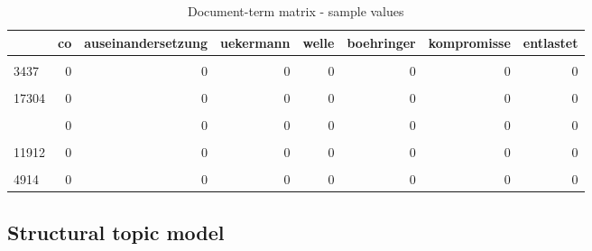 \documentclass[
  12pt,
]{article}
\begin{document}
\begin{table}[H]

\caption{\label{tab:Document term matrix}Document-term matrix - sample values \label{table:dtm}}
\centering
\fontsize{7}{9}\selectfont
\begin{tabular}[t]{lrrrrrrr}
\toprule
  & co & auseinandersetzung & uekermann & welle & boehringer & kompromisse & entlastet\\
\midrule
\cellcolor{gray!6}{16805} & \cellcolor{gray!6}{0} & \cellcolor{gray!6}{0} & \cellcolor{gray!6}{0} & \cellcolor{gray!6}{0} & \cellcolor{gray!6}{0} & \cellcolor{gray!6}{0} & \cellcolor{gray!6}{0}\\
3437 & 0 & 0 & 0 & 0 & 0 & 0 & 0\\
\cellcolor{gray!6}{10876} & \cellcolor{gray!6}{0} & \cellcolor{gray!6}{0} & \cellcolor{gray!6}{0} & \cellcolor{gray!6}{0} & \cellcolor{gray!6}{0} & \cellcolor{gray!6}{0} & \cellcolor{gray!6}{0}\\
17304 & 0 & 0 & 0 & 0 & 0 & 0 & 0\\
\cellcolor{gray!6}{18} & \cellcolor{gray!6}{3} & \cellcolor{gray!6}{0} & \cellcolor{gray!6}{1} & \cellcolor{gray!6}{0} & \cellcolor{gray!6}{0} & \cellcolor{gray!6}{1} & \cellcolor{gray!6}{0}\\
\addlinespace
11197 & 0 & 0 & 0 & 0 & 0 & 0 & 0\\
\cellcolor{gray!6}{2393} & \cellcolor{gray!6}{0} & \cellcolor{gray!6}{0} & \cellcolor{gray!6}{0} & \cellcolor{gray!6}{0} & \cellcolor{gray!6}{0} & \cellcolor{gray!6}{0} & \cellcolor{gray!6}{0}\\
11912 & 0 & 0 & 0 & 0 & 0 & 0 & 0\\
\cellcolor{gray!6}{11556} & \cellcolor{gray!6}{0} & \cellcolor{gray!6}{0} & \cellcolor{gray!6}{0} & \cellcolor{gray!6}{0} & \cellcolor{gray!6}{0} & \cellcolor{gray!6}{0} & \cellcolor{gray!6}{0}\\
4914 & 0 & 0 & 0 & 0 & 0 & 0 & 0\\
\bottomrule
\end{tabular}
\end{table}

\hypertarget{structural-topic-model}{%
\subsection{Structural topic model}\label{structural-topic-model}}
\end{document}
